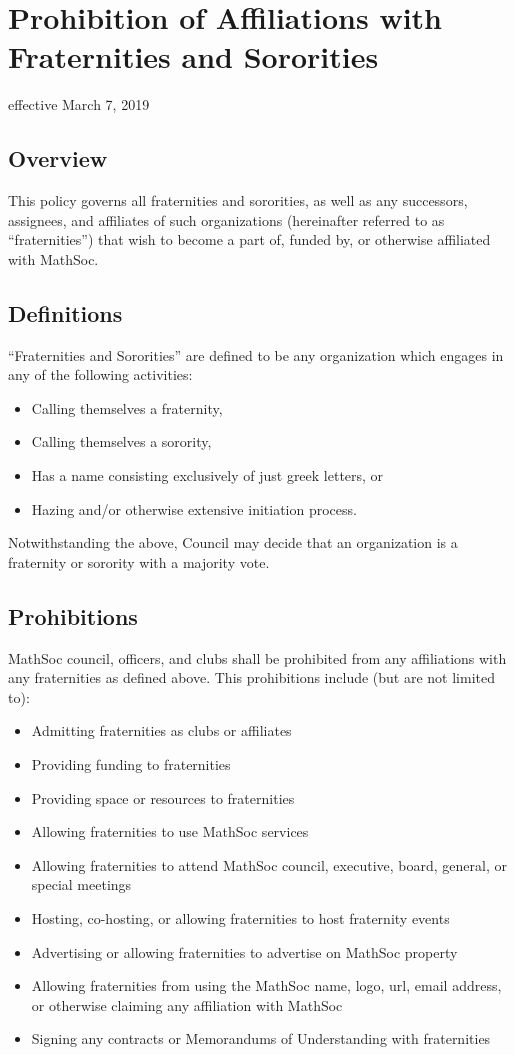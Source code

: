 \section{Prohibition of Affiliations with Fraternities and Sororities}
effective March 7, 2019

\subsection{Overview}
This policy governs all fraternities and sororities, as well as any successors, assignees, and affiliates of such organizations (hereinafter referred to as “fraternities”) that wish to become a part of, funded by, or otherwise affiliated with MathSoc.

\subsection{Definitions}
“Fraternities and Sororities” are defined to be any organization which engages in any of the following activities:
\begin{itemize}
    \item Calling themselves a fraternity,
    \item Calling themselves a sorority,
    \item Has a name consisting exclusively of just greek letters, or 
    \item Hazing and/or otherwise extensive initiation process.
\end{itemize}

Notwithstanding the above, Council may decide that an organization is a fraternity or sorority with a majority vote.

\subsection{Prohibitions}

MathSoc council, officers, and clubs shall be prohibited from any affiliations with any fraternities as defined above. This prohibitions include (but are not limited to):

\begin{itemize}
\item Admitting fraternities as clubs or affiliates
\item Providing funding to fraternities
\item Providing space or resources to fraternities
\item Allowing fraternities to use MathSoc services
\item Allowing fraternities to attend MathSoc council, executive, board, general, or special meetings
\item Hosting, co-hosting, or allowing fraternities to host fraternity events
\item Advertising or allowing fraternities to advertise on MathSoc property
\item Allowing fraternities from using the MathSoc name, logo, url, email address, or otherwise claiming any affiliation with MathSoc
\item Signing any contracts or Memorandums of Understanding with fraternities
\end{itemize}

